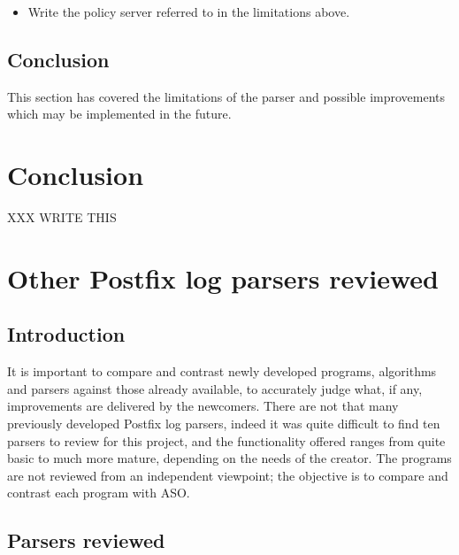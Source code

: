 \documentclass[a4paper,12pt,draft]{article}
\newcommand{\parsername}{ASO}
\begin{document}
\begin{itemize}

    \item Write the policy server referred to in the limitations above.

\end{itemize}

\subsection{Conclusion}

This section has covered the limitations of the parser and possible
improvements which may be implemented in the future.

\section{Conclusion}

\label{conclusion}

XXX WRITE THIS


\appendix


\section{Other Postfix log parsers reviewed}

\label{other-parsers}

\subsection{Introduction}

It is important to compare and contrast newly developed programs,
algorithms and parsers against those already available, to accurately judge
what, if any, improvements are delivered by the newcomers.  There are not
that many previously developed Postfix log parsers, indeed it was quite
difficult to find ten parsers to review for this project, and the
functionality offered ranges from quite basic to much more mature,
depending on the needs of the creator.  The programs are not reviewed from
an independent viewpoint; the objective is to compare and contrast each
program with \parsername{}.

\subsection{Parsers reviewed}
\end{document}
